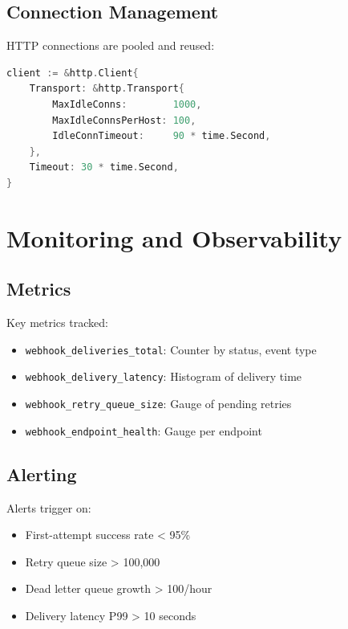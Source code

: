 \documentclass[11pt,a4paper]{article}
\begin{document}
\subsection{Connection Management}

HTTP connections are pooled and reused:

\begin{lstlisting}[language=Go, caption=HTTP Client Configuration]
client := &http.Client{
    Transport: &http.Transport{
        MaxIdleConns:        1000,
        MaxIdleConnsPerHost: 100,
        IdleConnTimeout:     90 * time.Second,
    },
    Timeout: 30 * time.Second,
}
\end{lstlisting}

\section{Monitoring and Observability}

\subsection{Metrics}

Key metrics tracked:

\begin{itemize}
    \item \texttt{webhook\_deliveries\_total}: Counter by status, event type
    \item \texttt{webhook\_delivery\_latency}: Histogram of delivery time
    \item \texttt{webhook\_retry\_queue\_size}: Gauge of pending retries
    \item \texttt{webhook\_endpoint\_health}: Gauge per endpoint
\end{itemize}

\subsection{Alerting}

Alerts trigger on:

\begin{itemize}
    \item First-attempt success rate < 95\%
    \item Retry queue size > 100,000
    \item Dead letter queue growth > 100/hour
    \item Delivery latency P99 > 10 seconds
\end{itemize}
\end{document}
